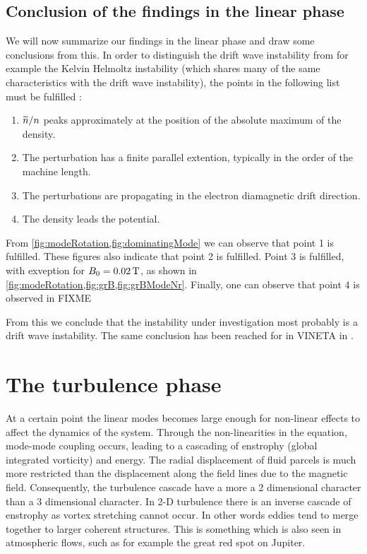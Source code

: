 \subsection{Conclusion of the findings in the linear phase}
%
We will now summarize our findings in the linear phase and draw some conclusions from this.
In order to distinguish the drift wave instability from for example the Kelvin Helmoltz instability (which shares many of the same characteristics with the drift wave instability), the points in the following list must be fulfilled \cite{Jassby1972,Hendel1968}:
%
\begin{enumerate}[noitemsep]
    \item $\widetilde{ n}/n$ peaks approximately at the position of the absolute maximum of the density.
    \item The perturbation has a finite parallel extention, typically in the order of the machine length.
    \item The perturbations are propagating in the electron diamagnetic drift direction.
    \item The density leads the potential.
\end{enumerate}
%
From \cref{fig:modeRotation,fig:dominatingMode} we can observe that point 1 is fulfilled.
These figures also indicate that point 2 is fulfilled.
Point 3 is fulfilled, with exveption for $B_0=0.02\, \text{T}$, as shown in \cref{fig:modeRotation,fig:grB,fig:grBModeNr}.
Finally, one can observe that point 4 is observed in FIXME

From this we conclude that the instability under investigation most probably is a drift wave instability.
The same conclusion has been reached for in VINETA in \cite{Schroder2005}.

\section{The turbulence phase}
\label{sec:satTurb}
%
At a certain point the linear modes becomes large enough for non-linear effects to affect the dynamics of the system.
Through the non-linearities in the equation, mode-mode coupling occurs, leading to a cascading of enstrophy (global integrated vorticity) and energy.
The radial displacement of fluid parcels is much more restricted than the displacement along the field lines due to the magnetic field.
Consequently, the turbulence cascade have a more a 2 dimensional character than a 3 dimensional character.
In 2-D turbulence there is an inverse cascade of enstrophy as vortex stretching cannot occur.
In other words eddies tend to merge together to larger coherent structures.
This is something which is also seen in atmospheric flows, such as for example the great red spot on Jupiter.

